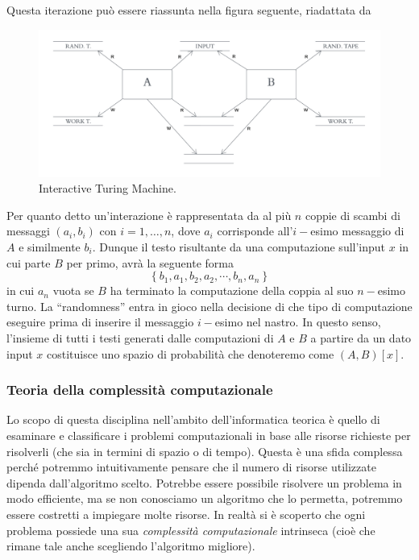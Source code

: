 \documentclass{article}
\theoremstyle{definition}
\begin{document}
Questa iterazione può essere riassunta nella figura seguente, riadattata da \cite[p. 292]{micali}
\begin{figure}[H]
    \centering
    \includegraphics[width=\textwidth]{imgs/ITM.png}
    \caption{Interactive Turing Machine.}
    \label{fig:itm}
\end{figure}

Per quanto detto un'interazione è rappresentata da al più $n$ coppie di scambi di messaggi $(a_i, b_i)$ con $i = 1, \dots, n$, dove $a_i$ corrisponde all'$i-$esimo messaggio di $A$ e similmente $b_i$.
Dunque il testo risultante da una computazione sull'input $x$ in cui parte $B$ per primo, avrà la seguente forma
\begin{equation*}
    \left\{ b_1, a_1, b_2, a_2, \cdots, b_n, a_n \right\}
\end{equation*}
in cui $a_n$ vuota se $B$ ha terminato la computazione della coppia al suo $n-$esimo turno.
La ``randomness'' entra in gioco nella decisione di che tipo di computazione eseguire prima di inserire il messaggio $i-$esimo nel nastro. In questo senso, l'insieme di tutti i testi generati dalle computazioni di $A$ e $B$ a partire da un dato input $x$ costituisce uno spazio di probabilità che denoteremo come $(A, B)[x]$.

\subsubsection{Teoria della complessità computazionale}\label{complessita}
Lo scopo di questa disciplina nell'ambito dell'informatica teorica è quello di esaminare e classificare i problemi computazionali in base alle risorse richieste per risolverli (che sia in termini di spazio o di tempo). Questa è una sfida complessa perché potremmo intuitivamente pensare che il numero di risorse utilizzate dipenda dall'algoritmo scelto. Potrebbe essere possibile risolvere un problema in modo efficiente, ma se non conosciamo un algoritmo che lo permetta, potremmo essere costretti a impiegare molte risorse. In realtà si è scoperto che ogni problema possiede una sua \emph{complessità computazionale} intrinseca (cioè che rimane tale anche scegliendo l'algoritmo migliore). 
\end{document}
